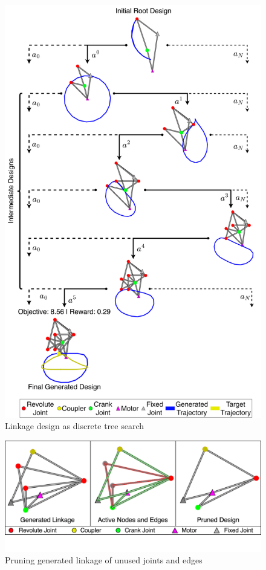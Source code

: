 \begin{figure}
    \centering
    \includegraphics[height=0.9\textheight]{05_figure_graph_search.png}
    \caption{Linkage design as discrete tree search}
    \label{fig:tree-search}
\end{figure}

\begin{figure}
    \centering
    \includegraphics[width=0.9\linewidth]{06_figure_Prune_diagram.png}
    \caption{Pruning generated linkage of unused joints and edges}
    \label{fig:prune-linkage}
\end{figure}

